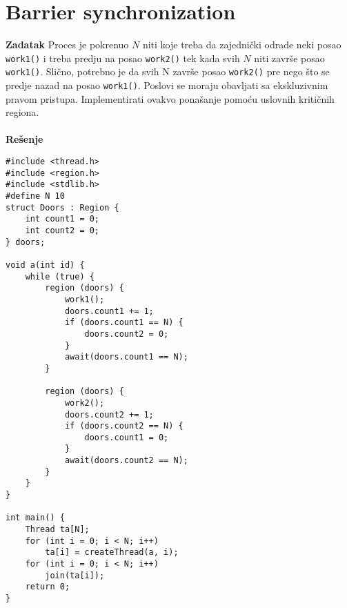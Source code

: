 \clearpage
\section{Barrier synchronization}
\textbf{\large Zadatak} Proces je pokrenuo $N$ niti koje treba da zajedni\v{c}ki odrade neki posao \texttt{work1()} i treba predju na posao \texttt{work2()} tek kada svih $N$ niti zavr\v{s}e posao \texttt{work1()}. Sli\v{c}no, potrebno je da svih $\mathrm N$ zavr\v{s}e posao \texttt{work2()} pre nego \v{s}to se predje nazad na posao \texttt{work1()}. Poslovi se moraju obavljati sa ekskluzivnim pravom pristupa. Implementirati ovakvo pona\v{s}anje pomo\'{c}u uslovnih kriti\v{c}nih regiona.
\\\\
\textbf{\large Re\v{s}enje}
\begin{lstlisting}
#include <thread.h>
#include <region.h>
#include <stdlib.h>
#define N 10
struct Doors : Region {
    int count1 = 0;
    int count2 = 0;
} doors;

void a(int id) {
    while (true) {
        region (doors) {
			work1();
            doors.count1 += 1;
            if (doors.count1 == N) {
                doors.count2 = 0;
            }
            await(doors.count1 == N);
        }

        region (doors) {
			work2();
            doors.count2 += 1;
            if (doors.count2 == N) {
                doors.count1 = 0;
            }
            await(doors.count2 == N);
        }
    }
}

int main() {
    Thread ta[N];
    for (int i = 0; i < N; i++) 
        ta[i] = createThread(a, i);
    for (int i = 0; i < N; i++) 
        join(ta[i]);
    return 0;
}

\end{lstlisting}
